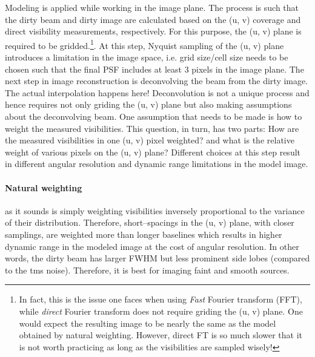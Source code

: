\documentclass[a4wide,12pt]{book}
\begin{document}
{Modeling is applied while working in the image plane. The process is such that the dirty beam and dirty image are calculated based on the (u, v) coverage and direct visibility measurements, respectively. For this purpose, the (u, v) plane is required to be gridded.\footnote{In fact, this is the issue one faces when using \emph{Fast} Fourier transform (FFT), while \emph{direct} Fourier transform does not require griding the (u, v) plane. One would expect the resulting image to be nearly the same as the model obtained by natural weighting. However, direct FT is so much slower that it is not worth practicing as long as the visibilities are sampled wisely!}. At this step, Nyquist sampling of the (u, v) plane introduces a limitation in the image space, i.e. grid size/cell size needs to  be chosen such that the final PSF includes at least 3 pixels in the image plane. The next step in image reconstruction is deconvolving the beam from the dirty image. The actual interpolation happens here! Deconvolution is not a unique process and hence requires not only griding the (u, v) plane but also making assumptions about the deconvolving beam. One assumption that needs to be made is how to weight the measured visibilities. This question, in turn, has two parts: How are the measured visibilities in one (u, v) pixel weighted? and what is the relative weight of various pixels on the (u, v) plane? Different choices at this step result in different angular resolution and dynamic range limitations in the model image.

\paragraph*{Natural weighting} as it sounds is simply weighting visibilities inversely proportional to the variance of their distribution.
Therefore, short--spacings in the (u, v) plane, with closer samplings, are weighted more than longer baselines which results in higher dynamic range in the modeled image at the cost of angular resolution. In other words, the dirty beam has larger FWHM but less prominent side lobes (compared to the tms noise). Therefore, it is best for imaging faint and smooth sources. 

}
\end{document}
